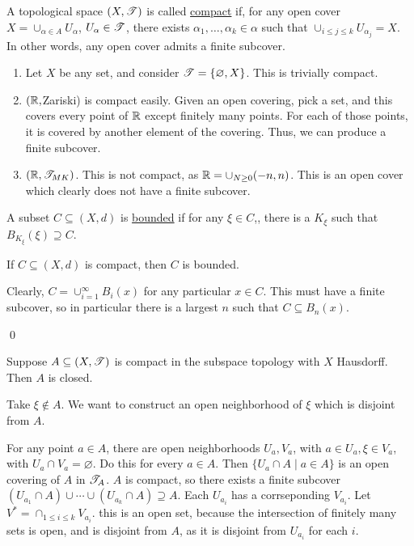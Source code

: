 \documentclass[x11names,reqno,14pt]{extarticle}
\newcommand*{\oo}{{\infty}}
\begin{document}

A topological space $(X, \mathscr{T})$ is called \underline{compact} if, for any open cover $X = \cup_{\alpha \in A}U_\alpha$, $U_\alpha \in \mathscr{T}$, there exists $\alpha_1, \dots, \alpha_k \in \alpha$ such that $\cup_{i\leq j\leq k}U_{\alpha_j} = X$. In other words, any open cover admits a finite subcover. 

\exm

\begin{enumerate}
\item Let $X$ be any set, and consider $\mathscr{T} = \{\varnothing, X\}$. This is trivially compact. 
\item $(\mathbb{R}, $Zariski) is compact easily. Given an open covering, pick a set, and this covers every point of $\mathbb{R}$ except finitely many points. For each of those points, it is covered by another element of the covering. Thus, we can produce a finite subcover. 
\item $(\mathbb{R}, \mathscr{T}_{MK})$. This is not compact, as $\mathbb{R} = \cup_{N\geq0}(-n, n)$. This is an open cover which clearly does not have a finite subcover. 
\end{enumerate}


A subset $C \subseteq (X, d)$ is \underline{bounded} if for any $\xi \in C$,, there is a $K_\xi$ such that $B_{K_\xi}(\xi)\supseteq C$. 

\lem

If $C \subseteq (X, d)$ is compact, then $C$ is bounded. 

\proof

Clearly, $C = \cup_{i=1}^\oo B_i(x)$ for any particular $x \in C$. This must have a finite subcover, so in particular there is a largest $n$ such that $C \subseteq B_n(x)$. 

\qed

\lem

Suppose $A \subseteq(X, \mathscr{T})$ is compact in the subspace topology with $X$ Hausdorff. Then $A$ is closed. 

\proof 

Take $\xi\not\in A$. We want to construct an open neighborhood of $\xi$ which is disjoint from $A$. 

For any point $a \in A$, there are open neighborhoods $U_a, V_a$, with $a \in U_a, \xi \in V_a$, with $U_a \cap V_a = \varnothing$. 
Do this for every $a \in A$. Then $\{U_a \cap A \mid a \in A \}$ is an open covering of $A$ in $\mathscr{T}_A$. $A$ is compact, so there exists a finite subcover $(U_{a_1} \cap A) \cup \cdots \cup (U_{a_k} \cap A) \supseteq A$. Each $U_{a_i}$ has a corrseponding $V_{a_i}$. Let $V^* = \cap_{1\leq i \leq k}V_{a_i}$. this is an open set, because the intersection of finitely many sets is open, and is disjoint from $A$, as it is disjoint from $U_{a_i}$ for each $i$. 
\end{document}

